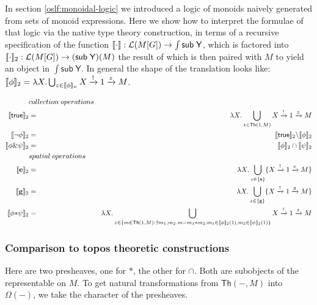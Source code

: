 In section \ref{oslf:monoidal-logic} we introduced a logic of monoids
naively generated from sets of monoid expressions. Here we show how to
interpret the formulae of that logic via the native type theory
construction, in terms of a recursive specification of the function $[\![ \cdot ]\!] : \mathcal{L}(M[G]) \to \int \mathsf{sub} \; \mathsf{Y}$, which is factored into $[\![ \cdot ]\!]_{2} : \mathcal{L}(M[G]) \to (\mathsf{sub} \; \mathsf{Y})(M)$ the result of which is then paired with $M$ to yield an object in $\int \mathsf{sub} \; \mathsf{Y}$. In general the shape of the translation looks like: $[\![ \mathsf{\phi} ]\!]_2  =  \lambda X.\bigcup_{z \in [\![ \mathsf{\phi} ]\!]_{n}} X \xrightarrow{!} 1 \xrightarrow{z} M$.

\begin{eqnarray*}
  & collection \; operations & \\
  \meaningof{\mathsf{true}}_{2} & = & \lambda X.\bigcup_{z \in \mathsf{Th}(1,M)} X \xrightarrow{!} 1 \xrightarrow{z} M \\
  \meaningof{\neg \phi}_{2} & = & \meaningof{\mathsf{true}}_{2} \backslash \meaningof{\phi}_{2} \\
  \meaningof{\phi \& \psi}_{2} & = & \meaningof{\phi}_{2} \cap \meaningof{\psi}_{2} \\
  & spatial \; operations & \\
  \meaningof{\mathbf{e}}_{2} & = & \lambda X.\bigcup_{z \in \{\mathsf{e}\}} \{ X \xrightarrow{!} 1 \xrightarrow{e} M \} \\
  \meaningof{\mathbf{g}}_{2} & = & \lambda X.\bigcup_{z \in \{\mathsf{g}\}} \{ X \xrightarrow{!} 1 \xrightarrow{g} M \} \\
  \meaningof{\phi \mathbf{*} \psi}_{2} & = & \lambda X.\bigcup_{ z \in \{ m \in \mathsf{Th}(1,M) : \exists m_{1}, m_{2}.m = m_{1} \mathsf{*} m_{2}, m_{1} \in \meaningof{\phi}_{2}(1), m_{2} \in \meaningof{\psi}_{2}(1) \}} X \xrightarrow{!} 1 \xrightarrow{z} M
\end{eqnarray*}


\subsubsection{Comparison to topos theoretic constructions}
Here are two presheaves, one for $\mathsf{*}$, the other for $\cap$.  Both are
subobjects of the representable on $M$.  To get natural transformations
from $\mathsf{Th}(-, M)$ into $\Omega(-)$, we take the character of the presheaves.

